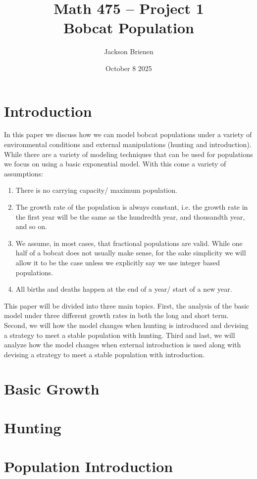 \documentclass{article}
\title{Math 475 -- Project 1 \\ Bobcat Population}
\author{Jackson Brienen}
\date{October 8 2025}
\begin{document}
\maketitle

\section{Introduction}
In this paper we discuss how we can model bobcat populations under a variety of environmental conditions and external manipulations (hunting and introduction). While there are a variety of modeling techniques that can be used for populations we focus on using a basic exponential model. With this come a variety of assumptions:

\begin{enumerate}
    \item There is no carrying capacity/ maximum population.
    \item The growth rate of the population is always constant, i.e. the growth rate in the first year will be the same as the hundredth year, and thousandth year, and so on.
    \item We assume, in most cases, that fractional populations are valid. While one half of a bobcat does not usually make sense, for the sake simplicity we will allow it to be the case unless we explicitly say we use integer based populations.
    \item All births and deaths happen at the end of a year/ start of a new year.
\end{enumerate}

This paper will be divided into three main topics. First, the analysis of the basic model under three different growth rates in both the long and short term. Second, we will how the model changes when hunting is introduced and devising a strategy to meet a stable population with hunting. Third and last, we will analyze how the model changes when external introduction is used along with devising a strategy to meet a stable population with introduction.


\section{Basic Growth}

\section{Hunting}

\section{Population Introduction}
\end{document}
